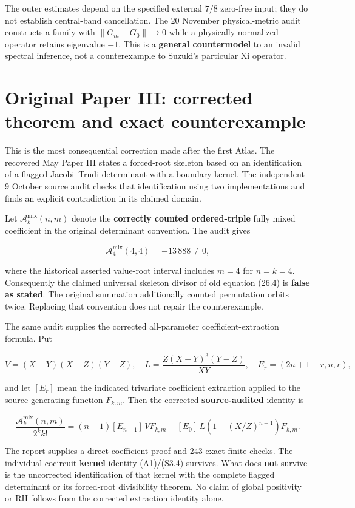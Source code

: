 \documentclass[
  10pt,
  a4paper,
  10pt,
  oneside,
  openany]{book}
\begin{document}
The outer estimates depend on the specified external \(7/8\) zero-free
input; they do not establish central-band cancellation. The 20 November
physical-metric audit constructs a family with \(\|G_m-G_0\|\to0\) while
a physically normalized operator retains eigenvalue \(-1\). This is a
\textbf{general countermodel} to an invalid spectral inference, not a
counterexample to Suzuki's particular Xi operator.

\section{Original Paper III: corrected theorem and exact
counterexample}\label{atlas-corrected-original-paper-iii}

This is the most consequential correction made after the first Atlas.
The recovered May Paper III states a forced-root skeleton based on an
identification of a flagged Jacobi--Trudi determinant with a boundary
kernel. The independent 9 October source audit checks that
identification using two implementations and finds an explicit
contradiction in its claimed domain.

Let \(\mathcal A_k^{\mathrm{mix}}(n,m)\) denote the \textbf{correctly
counted ordered-triple} fully mixed coefficient in the original
determinant convention. The audit gives

\[
 \boxed{\mathcal A_4^{\mathrm{mix}}(4,4)=-13\,888\ne0,}
 \tag{A37}\label{eq:A37}
\]

where the historical asserted value-root interval includes \(m=4\) for
\(n=k=4\). Consequently the claimed universal skeleton divisor of old
equation (26.4) is \textbf{false as stated}. The original summation
additionally counted permutation orbits twice. Replacing that convention
does not repair the counterexample.

The same audit supplies the corrected all-parameter
coefficient-extraction formula. Put

\[
 V=(X-Y)(X-Z)(Y-Z),\quad L=\frac{Z(X-Y)^3(Y-Z)}{XY},
 \quad E_r=(2n+1-r,n,r),
\]

and let \([E_r]\) mean the indicated trivariate coefficient extraction
applied to the source generating function \(F_{k,m}\). Then the
corrected \textbf{source-audited} identity is

\[
 \boxed{\frac{\mathcal A_k^{\mathrm{mix}}(n,m)}{2^k k!}
 =(n-1)[E_{n-1}]\,V F_{k,m}
 -[E_0]\,L\!\left(1-(X/Z)^{n-1}\right)F_{k,m}.}
 \tag{A38}\label{eq:A38}
\]

The report supplies a direct coefficient proof and 243 exact finite
checks. The individual cocircuit \textbf{kernel} identity (A1)/(S3.4)
survives. What does \textbf{not} survive is the uncorrected
identification of that kernel with the complete flagged determinant or
its forced-root divisibility theorem. No claim of global positivity or
RH follows from the corrected extraction identity alone.
\end{document}
